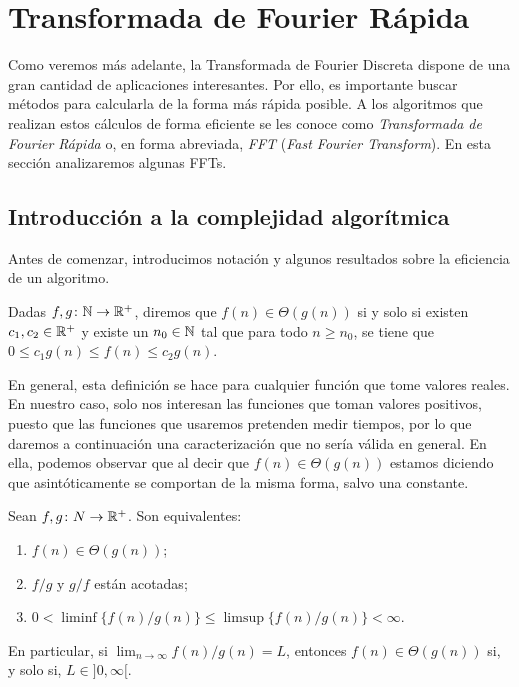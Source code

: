\documentclass{article}
\begin{document}
\newpage


\section{Transformada de Fourier Rápida} \label{sec:fft}

Como veremos más adelante, la Transformada de Fourier Discreta dispone de una gran cantidad de aplicaciones interesantes. Por ello, es importante buscar métodos para calcularla de la forma más rápida posible. A los algoritmos que realizan estos cálculos de forma eficiente se les conoce como \emph{Transformada de Fourier Rápida} o, en forma abreviada, \emph{FFT} (\emph{Fast Fourier Transform}). En esta sección analizaremos algunas FFTs.

\subsection{Introducción a la complejidad algorítmica}

 Antes de comenzar, introducimos notación y algunos resultados sobre la eficiencia de un algoritmo.

\begin{definition}
    Dadas $f,g \colon \mathbb{N} \to \mathbb{R}^+$, diremos que $f(n) \in \Theta(g(n))$ si y solo si existen $c_1,c_2 \in \mathbb{R}^+$ y existe un $n_0 \in \mathbb{N}$ tal que para todo $n \ge n_0$, se tiene que $0 \le c_1g(n) \le f(n) \le c_2g(n)$.
\end{definition}

En general, esta definición se hace para cualquier función que tome valores reales. En nuestro caso, solo nos interesan las funciones que toman valores positivos, puesto que las funciones que usaremos pretenden medir tiempos, por lo que daremos a continuación una caracterización que no sería válida en general. En ella, podemos observar que al decir que $f(n) \in \Theta(g(n))$ estamos diciendo que asintóticamente se comportan de la misma forma, salvo una constante.

\begin{prop} \label{prop:theta_limite}
    Sean $f,g \colon N \to \mathbb{R}^+$. Son equivalentes:
    \begin{enumerate}
        \item $f(n) \in \Theta(g(n))$; \label{item:prop:theta:a}
        \item $f/g$ y $g/f$ están acotadas; \label{item:prop:theta:b}  
        \item $0 < \liminf\{f(n)/g(n)\} \le \limsup\{f(n)/g(n)\} < \infty$. \label{item:prop:theta:c}
    \end{enumerate}
    En particular, si $\lim_{n\to\infty} f(n) / g(n)=L$, entonces $f(n) \in \Theta(g(n))$ si, y solo si, $L \in ]0,\infty[$.
\end{prop}
\end{document}
